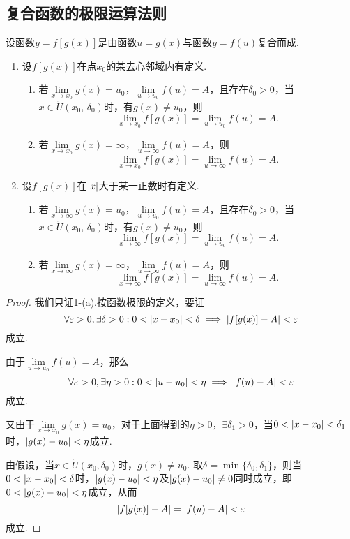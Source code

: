 \subsection{复合函数的极限运算法则}
\begin{theorem}
设函数\(y=f[g(x)]\)是由函数\(u=g(x)\)与函数\(y=f(u)\)复合而成.
\begin{enumerate}
\item 设\(f[g(x)]\)在点\(x_0\)的某去心邻域内有定义.
\begin{enumerate}
\item 若\(\lim\limits_{x \to x_0} g(x) = u_0\)，\(\lim\limits_{u \to u_0} f(u) = A\)，且存在\(\delta_0 > 0\)，当\(x \in \mathring{U}(x_0,\,\delta_0)\)时，有\(g(x) \neq u_0\)，则\[
\lim\limits_{x \to x_0} f[g(x)] = \lim\limits_{u \to u_0} f(u) = A.
\]
\item 若\(\lim\limits_{x \to x_0}g(x) = \infty\)，\(\lim\limits_{u \to \infty}f(u) = A\)，则\[
\lim\limits_{x \to x_0} f[g(x)] = \lim\limits_{u \to \infty} f(u) = A.
\]
\end{enumerate}
\item 设\(f[g(x)]\)在\(\abs{x}\)大于某一正数时有定义.
\begin{enumerate}
\item 若\(\lim\limits_{x \to \infty} g(x) = u_0\)，\(\lim\limits_{u \to u_0} f(u) = A\)，且存在\(\delta_0 > 0\)，当\(x \in \mathring{U}(x_0,\,\delta_0)\)时，有\(g(x) \neq u_0\)，则\[
\lim\limits_{x \to \infty} f[g(x)] = \lim\limits_{u \to u_0} f(u) = A.
\]
\item 若\(\lim\limits_{x \to \infty}g(x) = \infty\)，\(\lim\limits_{u \to \infty}f(u) = A\)，则\[
\lim\limits_{x \to \infty} f[g(x)] = \lim\limits_{u \to \infty} f(u) = A.
\]
\end{enumerate}
\end{enumerate}
\begin{proof}
我们只证1-(a).按函数极限的定义，要证\[
\forall\varepsilon>0, \exists\delta>0 :
0 < \abs{x - x_0} < \delta
\implies
\abs{ f[g(x)] - A } < \varepsilon
\]成立.

由于\(\lim\limits_{u \to u_0} f(u) = A\)，那么\[
\forall\varepsilon>0, \exists\eta>0 :
0 < \abs{u - u_0} < \eta
\implies
\abs{ f(u) - A } < \varepsilon
\]成立.

又由于\(\lim\limits_{x \to x_0} g(x) = u_0\)，对于上面得到的\(\eta > 0\)，\(\exists \delta_1 > 0\)，当\(0 < \abs{x - x_0} < \delta_1\)时，\(\abs{ g(x) - u_0 } < \eta\)成立.

由假设，当\(x \in \mathring{U}(x_0,\delta_0)\)时，\(g(x) \neq u_0\).
取\(\delta = \min\{\delta_0,\delta_1\}\)，则当\(0 < \abs{x - x_0} < \delta\)时，\(\abs{ g(x) - u_0 } < \eta\)及\(\abs{ g(x) - u_0 } \neq 0\)同时成立，即\(0 < \abs{ g(x) - u_0 } < \eta\)成立，从而\[
\abs{ f[g(x)] - A } = \abs{ f(u) - A } < \varepsilon
\]成立.
\end{proof}
\end{theorem}

